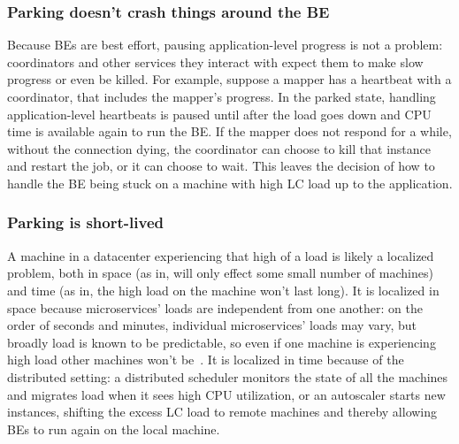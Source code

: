 \subsubsection{Parking doesn't crash things around the BE}
Because BEs are best effort, pausing application-level progress is not a
problem: coordinators and other services they interact with expect them to make
slow progress or even be killed. For example, suppose a mapper has a heartbeat
with a coordinator, that includes the mapper's progress. In the parked state,
handling application-level heartbeats is paused until after the load goes down
and CPU time is available again to run the BE. If the mapper does not respond
for a while, without the connection dying, the coordinator can choose to kill
that instance and restart the job, or it can choose to wait. This leaves the
decision of how to handle the BE being stuck on a machine with high LC load up
to the application.

\subsubsection{Parking is short-lived}
A machine in a datacenter experiencing that high of a load is likely a localized
problem, both in space (as in, will only effect some small number of machines)
and time (as in, the high load on the machine won't last long). It is localized
in space because microservices' loads are independent from one another: on the
order of seconds and minutes, individual microservices' loads may vary, but
broadly load is known to be predictable, so even if one machine is experiencing
high load other machines won't be~\cite{TODO}. It is localized in time because
of the distributed setting: a distributed scheduler monitors the state of all
the machines and migrates load when it sees high CPU utilization, or an
autoscaler starts new instances, shifting the excess LC load to remote machines
and thereby allowing BEs to run again on the local machine.